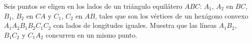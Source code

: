 Seis puntos se eligen en los lados de un triángulo equilátero $ABC$: $A_1$, $A_2$ en $BC$, $B_1$, $B_2$ en $CA$ y $C_1$, $C_2$ en $AB$, tales que son los vértices de un hexágono convexo $A_1A_2B_1B_2C_1C_2$ con lados de longitudes iguales. Muestra que las líneas $A_1B_2$, $B_1C_2$ y $C_1A_2$ concurren en un mismo punto.